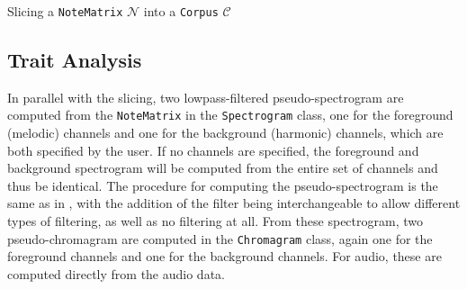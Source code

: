 \begin{algorithm}[h!]
\caption{Slicing a \texttt{NoteMatrix} $\mathcal N$ into a \texttt{Corpus} $\mathcal C$}
\begin{algorithmic}[1]\label{eq:4-slicing}
			\label{lst:4-slicing-concat}
		\ELSE
		\ENDIF
	\ENDFOR
\end{algorithmic}
\end{algorithm}

\subsection{Trait Analysis}\label{sec:4-corpus-builder-trait}
In parallel with the slicing, two lowpass-filtered pseudo-spectrogram are computed  from the \texttt{NoteMatrix} in the \texttt{Spectrogram} class, one for the foreground (melodic) channels and one for the background (harmonic) channels, which are both specified by the user. If no channels are specified, the foreground and background spectrogram will be computed from the entire set of channels and thus be identical. The procedure for computing the pseudo-spectrogram is the same as in \cite{borg_2019}, with the addition of the filter being interchangeable to allow different types of filtering, as well as no filtering at all. From these spectrogram, two pseudo-chromagram are computed in the \texttt{Chromagram} class, again one for the foreground channels and one for the background channels. For audio, these are computed directly from the audio data.

